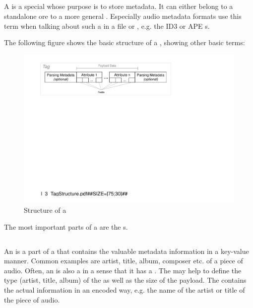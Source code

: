 
\subsection{\TERMtag{}}
\label{sec:Tag}

A \TERMtag{} is a special \TERMcontainer{} whose purpose is to store metadata. It can either belong to a standalone \TERMmetadataFormat{} ore to a more general \TERMcontainerFormat{}. Especially audio metadata formats use this term when talking about such a \TERMdataBlock{} in a file or \TERMmediaStream{}, e.g. the ID3 or APE \TERMtag{}s.

The following figure shows the basic structure of a \TERMtag{}, showing other basic terms:

\begin{figure}[H]
	\centering
		\includegraphics[width=1.00\textwidth]{Figures/Part_I/I_3_TagStructure.pdf}
		\caption{Structure of a \TERMtag{}}
	\label{fig:5_3_SCH_Tag}
\end{figure}

The most important parts of a \TERMtag{} are the \TERMattribute{}s.


\subsection{\TERMattribute{}}
\label{sec:Attribute}

An \TERMattribute{} is a part of a \TERMtag{} that contains the valuable metadata information in a key-value manner. Common examples are artist, title, album, composer etc. of a piece of audio. Often, an \TERMattribute{} is also a \TERMcontainer{} in a sense that it has a \TERMheader{}. The \TERMheader{} may help to define the type (artist, title, album) of the \TERMattribute{} as well as the size of the payload. The \TERMpayload{} contains the actual information in an encoded way, e.g. the name of the artist or title of the piece of audio.

